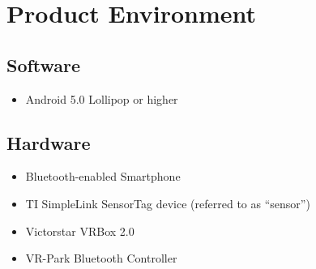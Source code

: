 \section{Product Environment}

\subsection{Software}

\begin{itemize}
  \item Android 5.0 Lollipop or higher
\end{itemize}

\subsection{Hardware}

\begin{itemize}
  \item Bluetooth-enabled Smartphone
  \item TI SimpleLink SensorTag device (referred to as ``sensor'')
  \item Victorstar VRBox 2.0
  \item VR-Park Bluetooth Controller
\end{itemize}
